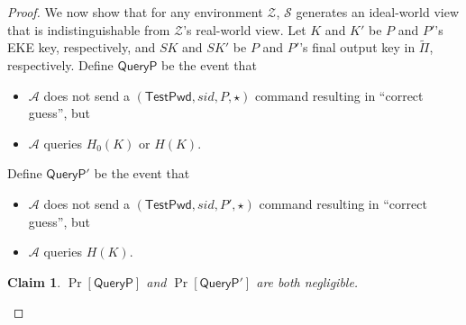 \documentclass{article}
\newtheorem{claim}{Claim}
\newcommand{\adv}{\mathcal{A}}
\newcommand{\env}{\mathcal{Z}}
\renewcommand{\sim}{\mathcal{S}}
\newcommand{\TestPwd}{\mathsf{TestPwd}}
\begin{document}
\begin{proof}
We now show that for any environment $\env$, $\sim$ generates an ideal-world view that is indistinguishable from $\env$'s real-world view. Let $K$ and $K'$ be $P$ and $P'$'s EKE key, respectively, and $SK$ and $SK'$ be $P$ and $P'$'s final output key in $\tilde{\Pi}$, respectively. Define $\mathsf{QueryP}$ be the event that
\begin{itemize}
  \item $\adv$ does not send a $(\TestPwd, sid, P, \star)$ command resulting in ``correct guess'', but
  \item $\adv$ queries $H_0(K)$ or $H(K)$.
\end{itemize}
Define $\mathsf{QueryP'}$ be the event that
\begin{itemize}
  \item $\adv$ does not send a $(\TestPwd, sid, P', \star)$ command resulting in ``correct guess'', but
  \item $\adv$ queries $H(K)$.
\end{itemize}
\begin{claim}
$\Pr[\mathsf{QueryP}]$ and $\Pr[\mathsf{QueryP'}]$ are both negligible.
\end{claim}


\end{proof}
\end{document}
